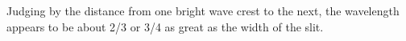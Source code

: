 Judging by the distance from one bright wave crest to the next, the wavelength appears to be about
2/3 or 3/4 as great as the width of the slit.




